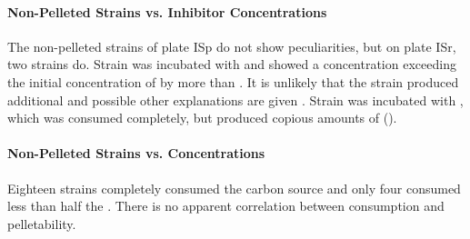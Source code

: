 \paragraph{Non-Pelleted Strains vs. Inhibitor Concentrations}
The non-pelleted strains of plate ISp do not show peculiarities, but on plate ISr, two strains do. Strain  was incubated with \laev{} and showed a \laev{} concentration exceeding the initial concentration of  by more than . It is unlikely that the strain produced additional \laev{} and possible other explanations are given . Strain  was incubated with \fora{}, which was consumed completely, but produced copious amounts of \acet{} ().

\paragraph{Non-Pelleted Strains vs. \GLC{} Concentrations}
Eighteen strains completely consumed the carbon source and only four consumed less than half the \glc{}. There is no apparent correlation between \glc{} consumption and pelletability.

